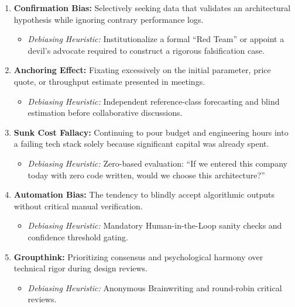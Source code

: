 \begin{methodbox}
\begin{enumerate}[leftmargin=1.5em]
    \item \textbf{Confirmation Bias:} Selectively seeking data that validates an architectural hypothesis while ignoring contrary performance logs.
    \begin{itemize}
        \item \textit{Debiasing Heuristic:} Institutionalize a formal ``Red Team'' or appoint a devil's advocate required to construct a rigorous falsification case.
    \end{itemize}
    \item \textbf{Anchoring Effect:} Fixating excessively on the initial parameter, price quote, or throughput estimate presented in meetings.
    \begin{itemize}
        \item \textit{Debiasing Heuristic:} Independent reference-class forecasting and blind estimation before collaborative discussions.
    \end{itemize}
    \item \textbf{Sunk Cost Fallacy:} Continuing to pour budget and engineering hours into a failing tech stack solely because significant capital was already spent.
    \begin{itemize}
        \item \textit{Debiasing Heuristic:} Zero-based evaluation: ``If we entered this company today with zero code written, would we choose this architecture?''
    \end{itemize}
    \item \textbf{Automation Bias:} The tendency to blindly accept algorithmic outputs without critical manual verification.
    \begin{itemize}
        \item \textit{Debiasing Heuristic:} Mandatory Human-in-the-Loop sanity checks and confidence threshold gating.
    \end{itemize}
    \item \textbf{Groupthink:} Prioritizing consensus and psychological harmony over technical rigor during design reviews.
    \begin{itemize}
        \item \textit{Debiasing Heuristic:} Anonymous Brainwriting and round-robin critical reviews.
    \end{itemize}
\end{enumerate}
\end{methodbox}

